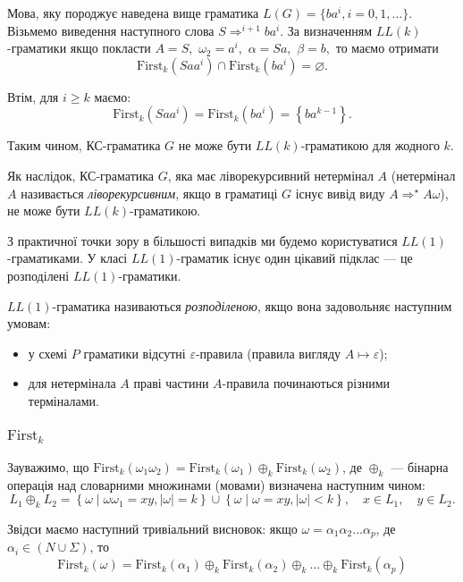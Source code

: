 Мова, яку породжує наведена вище граматика $L(G) = \{ ba^i, i = 0, 1, \ldots \}$. Візьмемо виведення наступного слова $S \Rightarrow^{i+1} b a^i$. За визначенням $LL(k)$-граматики якщо покласти $A = S,$ $\omega_2 = a^i,$ $\alpha = S a,$ $\beta = b,$ то маємо отримати
\[\text{First}_k \left(S a a^i\right) \cap \text{First}_k \left(b a^i\right) = \varnothing.\]

Втім, для $i \ge k$ маємо:\[\text{First}_k \left(S a a^i\right) = \text{First}_k \left(b a^i\right) = \left\{b a^{k - 1}\right\}.\]

Таким чином, КС-граматика $G$ не може бути $LL(k)$-граматикою для жодного $k$. \medskip

Як наслідок, КС-граматика $G$, яка має ліворекурсивний нетермінал $A$ (нетермінал $A$ називається \textit{ліворекурсивним}, якщо в граматиці $G$ існує вивід виду $A \Rightarrow^\star A \omega$), не може бути $LL(k)$-граматикою. \medskip

З практичної точки зору в більшості випадків ми будемо користуватися $LL(1)$-граматиками. У класі $LL(1)$-граматик існує один цікавий підклас --- це розподілені $LL(1)$-граматики. \medskip

$LL(1)$-граматика називаються \textit{розподіленою}, якщо вона задовольняє наступним умовам:
\begin{itemize}
	\item у схемі $P$ граматики відсутні $\varepsilon$-правила (правила вигляду $A \mapsto \varepsilon$);
	\item для нетермінала $A$ праві частини $A$-правила починаються різними терміналами.
\end{itemize}

\subsubsection{$\text{First}_k$}

Зауважимо, що $\text{First}_k (\omega_1 \omega_2) = \text{First}_k (\omega_1) \oplus_k \text{First}_k (\omega_2)$, де $\oplus_k$ --- бінарна операція над словарними множинами (мовами) визначена наступним чином:
\[L_1 \oplus_k L_2 = \left\{ \omega \mid \omega \omega_1 = x y, \vert\omega\vert = k \right\} \cup  \left\{ \omega \mid \omega = x y, \vert\omega\vert < k \right\}, \quad x \in L_1, \quad y \in L_2.\]

Звідси маємо наступний тривіальний висновок: якщо $\omega = \alpha_1 \alpha_2 \ldots \alpha_p$, де $\alpha_i \in (N \cup \Sigma)$, то
\[\text{First}_k (\omega) = \text{First}_k (\alpha_1) \oplus_k \text{First}_k (\alpha_2) \oplus_k \ldots \oplus_k \text{First}_k (\alpha_p)\]

